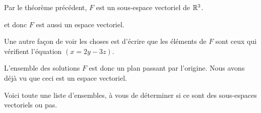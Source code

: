 \change

Par le théorème précédent, $F$ est un sous-espace vectoriel de $\mathbb{R}^3$.

\change

et donc $F$ est aussi un espace vectoriel.

\change


Une autre façon de voir les choses est d'écrire que les éléments de $F$ sont ceux qui vérifient
l'équation $(x = 2y - 3z)$.

L'ensemble des solutions $F$ est donc un plan passant par l'origine. 
Nous avons déjà vu que ceci est un espace vectoriel. 



\diapo

Voici toute une liste d'ensembles, à vous de déterminer si ce sont des sous-espaces vectoriels ou pas.


